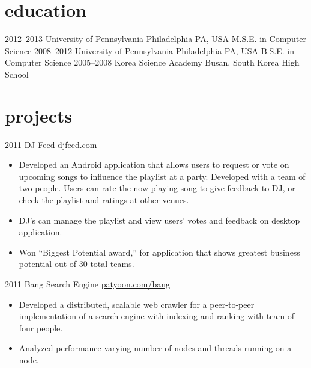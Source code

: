 \documentclass[]{patyoon-cv}
\begin{document}
\section{education}

\begin{entrylist}
  \entry
  {2012–2013}
  {University of Pennsylvania}
  {Philadelphia PA, USA}
  {M.S.E. in Computer Science}
  \entry
  {2008–2012}
  {University of Pennsylvania}
  {Philadelphia PA, USA}
  {B.S.E. in Computer Science}
  \entry
  {2005–2008}
  {Korea Science Academy}
  {Busan, South Korea}
  {High School}
\end{entrylist}

\section{projects}

\begin{entrylist}
  \entry
  {2011}
  {DJ Feed}
  {\href{http://djfeed.com}{djfeed.com}}
  {\begin{itemize}
    \item Developed an Android application that allows users to request or vote on upcoming songs to influence the playlist at a party. Developed with a team of two people. Users can rate the now playing song to give feedback to DJ, or check the playlist and ratings at other venues.
    \item DJ's can manage the playlist and view users' votes and feedback on desktop application.
    \item Won “Biggest Potential award,” for application that shows greatest business potential out of 30 total teams.
    \end{itemize}
  }
  \entry
  {2011}
  {Bang Search Engine}
  {\href{http://patyoon.com/bang}{patyoon.com/bang}}
  {
    \begin{itemize}
    \item Developed a distributed, scalable web crawler for a peer-to-peer implementation of a search engine with indexing and ranking with team of four people.
    \item Analyzed performance varying number of nodes and threads running on a node.
    \end{itemize}
  }
\end{entrylist}

\end{document}
